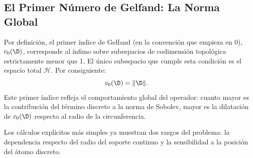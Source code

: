 \subsection{El Primer Número de Gelfand: La Norma Global}

Por definición, el primer índice de Gelfand (en la convención que empieza en $0$), $c_0(\D)$, corresponde al ínfimo sobre subespacios de codimensión topológica estrictamente menor que 1. El único subespacio que cumple esta condición es el espacio total $\mathcal{H}$. Por consiguiente:
$$ c_0(\D) = \|\D\|. $$
Este primer índice refleja el comportamiento global del operador: cuanto mayor es la contribución del término discreto a la norma de Sobolev, mayor es la dilatación de $c_0(\D)$ respecto al radio de la circunferencia.

Los cálculos explícitos más simples ya muestran dos rasgos del problema: la dependencia respecto del radio del soporte continuo y la sensibilidad a la posición del átomo discreto.

